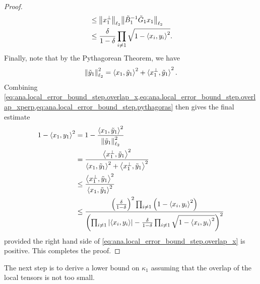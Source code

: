 \begin{proof}
\begin{align}
    &\le {\left\Vert x_1^\perp\right\Vert}_{\ell_2} {\left\Vert\tilde B_1^{-1} \tilde G_1 x_1\right\Vert}_{\ell_2} \\
    &\le \frac{\delta}{1 - \delta} \prod_{i \neq 1} \sqrt{1 - {\braket{x_i, y_i}}^2}.
    \label{eq:ana.local_error_bound_step.overlap_xperp}
  \end{align}
  Finally, note that by the Pythagorean Theorem, we have
  \[
    {\left\Vert\tilde y_1\right\Vert}_{\ell_2}^2
    = \braket{x_1, \tilde y_1}^2 + \braket{x_1^\perp, \tilde y_1}^2.
    \label{eq:ana.local_error_bound_step.pythagoras}
  \]
  Combining \cref{eq:ana.local_error_bound_step.overlap_x,eq:ana.local_error_bound_step.overlap_xperp,eq:ana.local_error_bound_step.pythagoras} then gives the final estimate
  \begin{align}
    1 - \braket{x_1, y_1}^2
    &= 1 - \frac{\braket{x_1, \tilde y_1}^2}{\Ltwonorm{\tilde y_1}^2} \\
    &= \frac{  \Braket{x_1^\perp, \tilde y_1}^2  }{  \Braket{x_1, \tilde y_1}^2 + \Braket{x_1^\perp, \tilde y_1}^2  } \\
    &\le \frac{  \Braket{x_1^\perp, \tilde y_1}^2  }{  \Braket{x_1, \tilde y_1}^2  } \\
    &\le \frac{%
      {\left(\frac{\delta}{1 - \delta}\right)}^2 \prod_{i \neq 1} \left(1 - {\braket{x_i, y_i}}^2 \right)
    }{%
      {\left( \prod_{i \neq 1} \Abs{\braket{x_i, y_i}} - \frac{\delta}{1 - \delta} \prod_{i \neq 1} \sqrt{1 - {\braket{x_i, y_i}}^2} \right)}^2
    }
  \end{align}
  provided the right hand side of \cref{eq:ana.local_error_bound_step.overlap_x} is positive.
  This completes the proof.
\end{proof}

The next step is to derive a lower bound on $\kappa_1$ assuming that the overlap of the local tensors is not too small.

